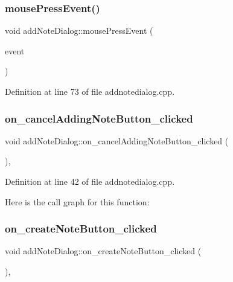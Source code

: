 \subsubsection{\texorpdfstring{mouse\+Press\+Event()}{mousePressEvent()}}
{\footnotesize\ttfamily void add\+Note\+Dialog\+::mouse\+Press\+Event (\begin{DoxyParamCaption}\item[{Q\+Mouse\+Event $\ast$}]{event }\end{DoxyParamCaption})\hspace{0.3cm}{\ttfamily [private]}}



Definition at line 73 of file addnotedialog.\+cpp.

\hypertarget{classaddNoteDialog_af0e53e8f605b12087a3982e53409ca2f}{}\label{classaddNoteDialog_af0e53e8f605b12087a3982e53409ca2f} 
\subsubsection{\texorpdfstring{on\+\_\+cancel\+Adding\+Note\+Button\+\_\+clicked}{on\_cancelAddingNoteButton\_clicked}}
{\footnotesize\ttfamily void add\+Note\+Dialog\+::on\+\_\+cancel\+Adding\+Note\+Button\+\_\+clicked (\begin{DoxyParamCaption}{ }\end{DoxyParamCaption})\hspace{0.3cm}{\ttfamily [private]}, {\ttfamily [slot]}}



Definition at line 42 of file addnotedialog.\+cpp.

Here is the call graph for this function\+:
\hypertarget{classaddNoteDialog_a67b28dc05851888a45774eb240d6e43d}{}\label{classaddNoteDialog_a67b28dc05851888a45774eb240d6e43d} 
\subsubsection{\texorpdfstring{on\+\_\+create\+Note\+Button\+\_\+clicked}{on\_createNoteButton\_clicked}}
{\footnotesize\ttfamily void add\+Note\+Dialog\+::on\+\_\+create\+Note\+Button\+\_\+clicked (\begin{DoxyParamCaption}{ }\end{DoxyParamCaption})\hspace{0.3cm}{\ttfamily [private]}, {\ttfamily [slot]}}



